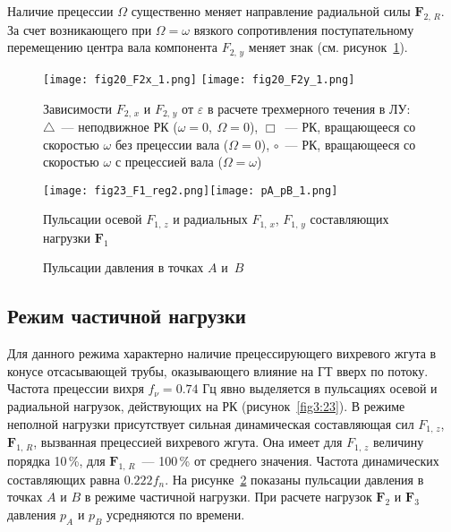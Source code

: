 Наличие прецессии $\Omega$ существенно меняет направление радиальной силы $\textbf{F}_{2,\,R}$. 
За счет возникающего при $\Omega=\omega$ вязкого сопротивления поступательному перемещению центра вала 
компонента $F_{2,\,y}$ меняет знак (см. рисунок~\ref{fig3:20}).
\begin{figure}[!hb]
  \centering
  \texttt{[image: fig20\_F2x\_1.png]}\hfill
  \texttt{[image: fig20\_F2y\_1.png]}
  \caption{Зависимости $F_{2,\,x}$ и $F_{2,\,y}$ от $\varepsilon$ в расчете трехмерного течения в ЛУ:
  $\triangle$~--- неподвижное РК ($\omega=0,\ \Omega=0$), $\Box$~--- РК, вращающееся 
  со скоростью $\omega$ без прецессии вала ($\Omega=0$),
  $\circ$~--- РК, вращающееся со скоростью $\omega$ с прецессией вала ($\Omega=\omega$)}
  \label{fig3:20}
\end{figure}

\begin{figure}[!b]
  \texttt{[image: fig23\_F1\_reg2.png]}\hfill \texttt{[image: pA\_pB\_1.png]}\\[-5mm]
\parbox[t]{0.48\textwidth}{\caption{Пульсации осевой $F_{1,\,z}$ и 
радиальных $F_{1,\,x}$, $F_{1,\,y}$ составляющих нагрузки $\textbf{F}_1$ \label{fig3:23}}}\hfill
\parbox[t]{0.48\textwidth}{\caption{Пульсации давления в точках $A$ и~$B$}\label{fig3:25}}
\end{figure}

\subsection{Режим частичной нагрузки}
\label{s:362}
Для данного режима характерно наличие прецессирующего вихревого жгута в конусе отсасывающей трубы, 
оказывающего влияние на ГТ вверх по потоку. Частота прецессии вихря $f_\nu=0.74$ Гц явно выделяется
в пульсациях осевой и радиальной нагрузок, действующих на РК (рисунок~\ref{fig3:23}).
В режиме неполной нагрузки присутствует сильная динамическая составляющая 
сил $F_{1,\,z}$, $\textbf{F}_{1,\,R}$, вызванная прецессией вихревого жгута. Она имеет
для  $F_{1,\,z}$ величину порядка 10\,\%, для $\textbf{F}_{1,\,R}$~--- 100\,\% от среднего значения. 
Частота динамических составляющих равна $0.222 f_n$.
На рисунке~\ref{fig3:25} показаны пульсации давления в точках $A$ и $B$ в режиме частичной нагрузки.
При расчете нагрузок $\textbf{F}_2$ и $\textbf{F}_3$ давления $p_A$ и $p_B$ усредняются по времени.

